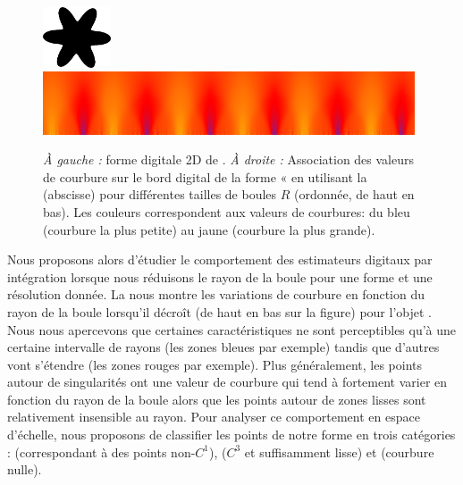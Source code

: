 \begin{figure}[ht]{
      \begin{center}
          \includegraphics[width=2cm]{images/Flower}
          \includegraphics[width=11cm]{images/ScaleSpace_Flower}
      \end{center}}
%
      \caption[Analyse en espace d'échelle de la courbure en fonction du rayon sur la forme digitale 2D de \Flower]
      {\emph{À gauche :} forme digitale 2D de \Flower. \emph{À droite :}
      Association des valeurs de courbure sur le bord digital de la forme «
      \Flower en utilisant la  (abscisse) pour différentes
      tailles de boules $R$ (ordonnée, de haut en bas). Les couleurs correspondent
      aux valeurs de courbures: du bleu (courbure la plus petite) au jaune (courbure
      la plus grande).\label{fig:curvature-scale-2d}}
\end{figure}

Nous proposons alors d'étudier le comportement des estimateurs digitaux par
intégration lorsque nous réduisons le rayon de la boule pour une forme et une
résolution donnée. La  nous montre les
variations de courbure en fonction du rayon de la boule lorsqu'il décroît (de
haut en bas sur la figure) pour l'objet \Flower. Nous nous apercevons que
certaines caractéristiques ne sont perceptibles qu'à une certaine intervalle de
rayons (les zones bleues par exemple) tandis que d'autres vont s'étendre (les
zones rouges par exemple). Plus généralement, les points autour de singularités
ont une valeur de courbure qui tend à fortement varier en fonction du rayon de
la boule alors que les points autour de zones lisses sont relativement
insensible au rayon. Pour analyser ce comportement en espace d'échelle, nous
proposons de classifier les points de notre forme en trois catégories :
\featedge (correspondant à des points non-$C^1$), \featsmooth ($C^3$ et
suffisamment lisse) et \featflat (courbure nulle).


